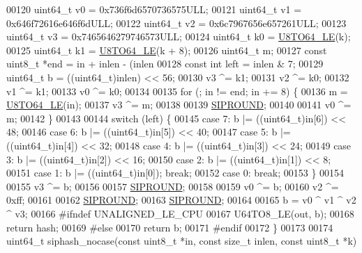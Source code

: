 \begin{DoxyCode}
{00120     uint64\_t v0 = 0x736f6d6570736575ULL;
00121     uint64\_t v1 = 0x646f72616e646f6dULL;
00122     uint64\_t v2 = 0x6c7967656e657261ULL;
00123     uint64\_t v3 = 0x7465646279746573ULL;
00124     uint64\_t k0 = \hyperlink{siphash_8c_a1de2481f51a86cbfa0b7d0cdd4d68a69}{U8TO64\_LE}(k);
00125     uint64\_t k1 = \hyperlink{siphash_8c_a1de2481f51a86cbfa0b7d0cdd4d68a69}{U8TO64\_LE}(k + 8);
00126     uint64\_t m;
00127     \textcolor{keyword}{const} uint8\_t *end = in + inlen - (inlen %
00128     \textcolor{keyword}{const} \textcolor{keywordtype}{int} left = inlen & 7;
00129     uint64\_t b = ((uint64\_t)inlen) << 56;
00130     v3 ^= k1;
00131     v2 ^= k0;
00132     v1 ^= k1;
00133     v0 ^= k0;
00134 
00135     \textcolor{keywordflow}{for} (; in != end; in += 8) \{
00136         m = \hyperlink{siphash_8c_a1de2481f51a86cbfa0b7d0cdd4d68a69}{U8TO64\_LE}(in);
00137         v3 ^= m;
00138 
00139         \hyperlink{siphash_8c_abd545ba6d36990ee5903ff4d0e6edecf}{SIPROUND};
00140 
00141         v0 ^= m;
00142     \}
00143 
00144     \textcolor{keywordflow}{switch} (left) \{
00145     \textcolor{keywordflow}{case} 7: b |= ((uint64\_t)in[6]) << 48;
00146     \textcolor{keywordflow}{case} 6: b |= ((uint64\_t)in[5]) << 40;
00147     \textcolor{keywordflow}{case} 5: b |= ((uint64\_t)in[4]) << 32;
00148     \textcolor{keywordflow}{case} 4: b |= ((uint64\_t)in[3]) << 24;
00149     \textcolor{keywordflow}{case} 3: b |= ((uint64\_t)in[2]) << 16;
00150     \textcolor{keywordflow}{case} 2: b |= ((uint64\_t)in[1]) << 8;
00151     \textcolor{keywordflow}{case} 1: b |= ((uint64\_t)in[0]); \textcolor{keywordflow}{break};
00152     \textcolor{keywordflow}{case} 0: \textcolor{keywordflow}{break};
00153     \}
00154 
00155     v3 ^= b;
00156 
00157     \hyperlink{siphash_8c_abd545ba6d36990ee5903ff4d0e6edecf}{SIPROUND};
00158 
00159     v0 ^= b;
00160     v2 ^= 0xff;
00161 
00162     \hyperlink{siphash_8c_abd545ba6d36990ee5903ff4d0e6edecf}{SIPROUND};
00163     \hyperlink{siphash_8c_abd545ba6d36990ee5903ff4d0e6edecf}{SIPROUND};
00164 
00165     b = v0 ^ v1 ^ v2 ^ v3;
00166 \textcolor{preprocessor}{#}\textcolor{preprocessor}{ifndef} UNALIGNED\_LE\_CPU
00167     U64TO8\_LE(out, b);
00168     \textcolor{keywordflow}{return} hash;
00169 \textcolor{preprocessor}{#}\textcolor{preprocessor}{else}
00170     \textcolor{keywordflow}{return} b;
00171 \textcolor{preprocessor}{#}\textcolor{preprocessor}{endif}
00172 \}
00173 
00174 uint64\_t siphash\_nocase(\textcolor{keyword}{const} uint8\_t *in, \textcolor{keyword}{const} size\_t inlen, \textcolor{keyword}{const} uint8\_t *k)
}
\end{DoxyCode}
